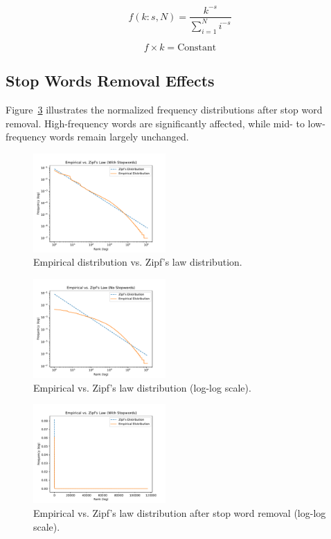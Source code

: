 \documentclass[11pt]{article}
\begin{document}
\begin{equation}
f(k: s, N) = \frac{k^{-s}}{\sum_{i=1}^{N} i^{-s}}
\label{eq:zipf1}
\end{equation}

\begin{equation}
f \times k = \text{Constant}
\label{eq:zipf2}
\end{equation}

\subsection{Stop Words Removal Effects}
Figure~\ref{fig:zipf3} illustrates the normalized frequency distributions after stop word removal. High-frequency words are significantly affected, while mid- to low-frequency words remain largely unchanged.

\begin{figure}[H]
\centering
\includegraphics[width=0.45\textwidth]{Task_1_1_fig.pdf}
\caption{Empirical distribution vs. Zipf's law distribution.}
\label{fig:zipf1}
\end{figure}

\begin{figure}[H]
\centering
\includegraphics[width=0.45\textwidth]{Task_1_2_fig.pdf}
\caption{Empirical vs. Zipf's law distribution (log-log scale).}
\label{fig:zipf2}
\end{figure}

\begin{figure}[H]
\centering
\includegraphics[width=0.45\textwidth]{Task_1_3_fig.pdf}
\caption{Empirical vs. Zipf's law distribution after stop word removal (log-log scale).}
\label{fig:zipf3}
\end{figure}
\end{document}

